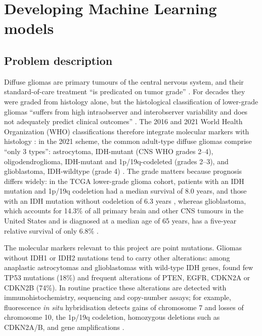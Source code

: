 \section{Developing Machine Learning models}

\subsection{Problem description}

Diffuse gliomas are primary tumours of the central nervous system, and their standard-of-care
treatment ``is predicated on tumor grade'' \cite{tasci2022}. For decades they were graded from
histology alone, but the histological classification of
lower-grade gliomas ``suffers from high intraobserver and interobserver variability and does not
adequately predict clinical outcomes'' \cite{tcga2015lgg}. The 2016 and 2021 World Health
Organization (WHO) classifications therefore integrate molecular markers with histology
\cite{louis2016,louis2021}: in the 2021 scheme, the common adult-type diffuse gliomas comprise ``only 3 types'':
astrocytoma, IDH-mutant (CNS WHO grades 2--4), oligodendroglioma, IDH-mutant and
1p/19q-codeleted (grades 2--3), and glioblastoma, IDH-wildtype (grade 4) \cite{louis2021}.
The grade matters because prognosis differs widely: in the TCGA lower-grade glioma cohort,
patients with an IDH mutation and 1p/19q codeletion had a median survival of 8.0 years, and those
with an IDH mutation without codeletion of 6.3 years \cite{tcga2015lgg}, whereas glioblastoma,
which accounts for 14.3\% of all primary brain and other CNS tumours in the United States and is
diagnosed at a median age of 65 years, has a five-year relative survival of only 6.8\%
\cite{ostrom2021}.

The molecular markers relevant to this project are point mutations. Gliomas without IDH1 or
IDH2 mutations tend to carry other alterations: among anaplastic astrocytomas and glioblastomas
with wild-type IDH genes, \cite{yan2009} found few TP53 mutations (18\%) and frequent alterations
of PTEN, EGFR, CDKN2A or CDKN2B (74\%). In routine practice these alterations are detected with
immunohistochemistry, sequencing and copy-number assays; for example, fluorescence \emph{in situ}
hybridisation detects gains of chromosome 7 and losses of chromosome 10, the 1p/19q codeletion,
homozygous deletions such as CDKN2A/B, and gene amplifications \cite{sahm2023}.

